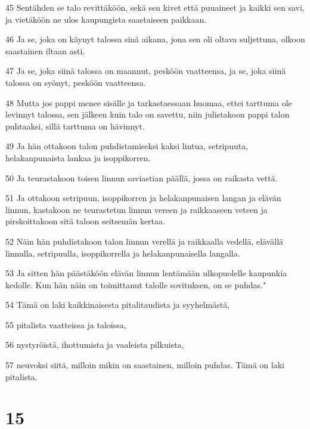 \par 45 Sentähden se talo revittäköön, sekä sen kivet että puuaineet ja kaikki sen savi, ja vietäköön ne ulos kaupungista saastaiseen paikkaan.
\par 46 Ja se, joka on käynyt talossa sinä aikana, jona sen oli oltava suljettuna, olkoon saastainen iltaan asti.
\par 47 Ja se, joka siinä talossa on maannut, pesköön vaatteensa, ja se, joka siinä talossa on syönyt, pesköön vaatteensa.
\par 48 Mutta jos pappi menee sisälle ja tarkastaessaan huomaa, ettei tarttuma ole levinnyt talossa, sen jälkeen kuin talo on savettu, niin julistakoon pappi talon puhtaaksi, sillä tarttuma on hävinnyt.
\par 49 Ja hän ottakoon talon puhdistamiseksi kaksi lintua, setripuuta, helakanpunaista lankaa ja isoppikorren.
\par 50 Ja teurastakoon toisen linnun saviastian päällä, jossa on raikasta vettä.
\par 51 Ja ottakoon setripuun, isoppikorren ja helakanpunaisen langan ja elävän linnun, kastakoon ne teurastetun linnun vereen ja raikkaaseen veteen ja pirskoittakoon sitä taloon seitsemän kertaa.
\par 52 Näin hän puhdistakoon talon linnun verellä ja raikkaalla vedellä, elävällä linnulla, setripuulla, isoppikorrella ja helakanpunaisella langalla.
\par 53 Ja sitten hän päästäköön elävän linnun lentämään ulkopuolelle kaupunkia kedolle. Kun hän näin on toimittanut talolle sovituksen, on se puhdas."
\par 54 Tämä on laki kaikkinaisesta pitalitaudista ja syyhelmästä,
\par 55 pitalista vaatteissa ja taloissa,
\par 56 nystyröistä, ihottumista ja vaaleista pilkuista,
\par 57 neuvoksi siitä, milloin mikin on saastainen, milloin puhdas. Tämä on laki pitalista.

\chapter{15}

